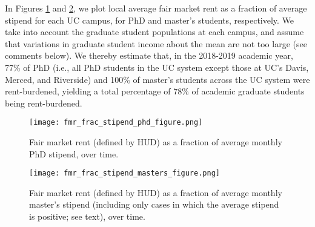 \documentclass{article}
\begin{document}
In Figures \ref{phdfmr} and \ref{masfmr}, we plot local average fair market rent as a fraction of average stipend for each UC campus, for PhD and master's students, respectively. We take into account the graduate student populations at each campus, and assume that variations in graduate student income about the mean are not too large (see comments below). We thereby estimate that, in the 2018-2019 academic year, 77\% of PhD (i.e., all PhD students in the UC system except those at UC's Davis, Merced, and Riverside) and 100\% of master's students across the UC system were rent-burdened, yielding a total percentage of 78\% of academic graduate students being rent-burdened. 
\begin{figure}[h]
    \centering
    \texttt{[image: fmr\_frac\_stipend\_phd\_figure.png]}
    \caption{Fair market rent (defined by HUD) as a fraction of average monthly PhD stipend, over time.}
    \label{phdfmr}
\end{figure}

\begin{figure}[h]
    \centering
    \texttt{[image: fmr\_frac\_stipend\_masters\_figure.png]}
    \caption{Fair market rent (defined by HUD) as a fraction of average monthly master's stipend (including only cases in which the average stipend is positive; see text), over time.}
    \label{masfmr}
\end{figure}
\clearpage
\newpage
\end{document}
